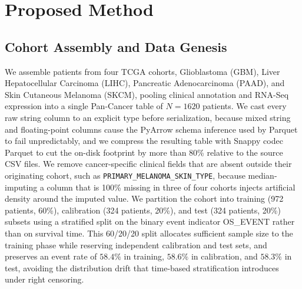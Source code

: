 \documentclass[sigconf, review=true]{acmart}
\begin{document}
\section{Proposed Method}

\subsection{Cohort Assembly and Data Genesis}
We assemble patients from four TCGA cohorts, Glioblastoma (GBM), Liver Hepatocellular Carcinoma (LIHC), Pancreatic Adenocarcinoma (PAAD), and Skin Cutaneous Melanoma (SKCM), pooling clinical annotation and RNA-Seq expression into a single Pan-Cancer table of $N = 1620$ patients. We cast every raw string column to an explicit type before serialization, because mixed string and floating-point columns cause the PyArrow schema inference used by Parquet to fail unpredictably, and we compress the resulting table with Snappy codec Parquet to cut the on-disk footprint by more than 80\% relative to the source CSV files. We remove cancer-specific clinical fields that are absent outside their originating cohort, such as \texttt{PRIMARY\_MELANOMA\_SKIN\_TYPE}, because median-imputing a column that is 100\% missing in three of four cohorts injects artificial density around the imputed value. We partition the cohort into training (972 patients, 60\%), calibration (324 patients, 20\%), and test (324 patients, 20\%) subsets using a stratified split on the binary event indicator OS\_EVENT rather than on survival time. This 60/20/20 split allocates sufficient sample size to the training phase while reserving independent calibration and test sets, and preserves an event rate of $58.4\%$ in training, $58.6\%$ in calibration, and $58.3\%$ in test, avoiding the distribution drift that time-based stratification introduces under right censoring.
\end{document}
